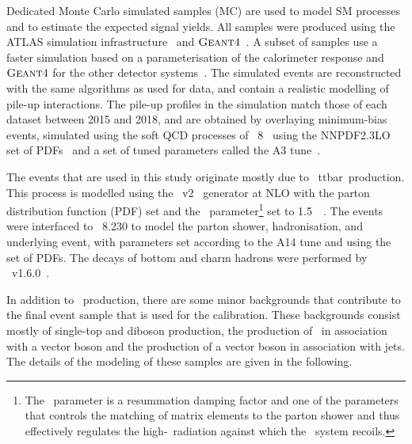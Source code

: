 \documentclass[letterpaper,12pt]{article}
\begin{document}
Dedicated Monte Carlo  simulated samples (MC)  are used to model SM
processes and to estimate the expected signal yields.  All samples were 
produced using the ATLAS simulation infrastructure~\cite{SOFT-2010-01}
and $\textsc{Geant}4$~\cite{Agostinelli:2002hh}. A subset of samples use a faster 
simulation based on a parameterisation of the calorimeter response and 
$\textsc{Geant}4$ for the other detector systems~\cite{SOFT-2010-01}. %
The simulated events are reconstructed with the same algorithms as
used for data, and contain a realistic modelling of pile-up
interactions. The pile-up profiles in the simulation match those of each dataset
between 2015 and 2018, and are obtained by overlaying minimum-bias events,
simulated using the soft QCD processes of
{\PYTHIA}~8~\cite{Sjostrand:2014zea} using the NNPDF2.3LO set of
PDFs~\cite{Ball:2012cx} and a set of tuned
parameters called the A3 tune~\cite{ATL-PHYS-PUB-2016-017}.

The events that are used in this study originate mostly due to \
ttbar\ production. This process is modelled using the
\powhegbox~v2~\cite{Frixione:2007nw,Nason:2004rx,Frixione:2007vw,Alioli:2010xd}
generator at NLO with the \nnpdfnlo %
parton distribution function (PDF) set
and the \hdamp\ parameter\footnote{The
  \hdamp\ parameter is a resummation damping factor and one of the
  parameters that controls the matching of \powheg matrix elements to
  the parton shower and thus effectively regulates the
  high-\pt\ radiation against which the \ttbar\ system recoils.} set
to 1.5~\mtop~\cite{ATL-PHYS-PUB-2016-020}.  The events were interfaced
to {\PYTHIA}~8.230 to model the parton shower,
hadronisation, and underlying event, with parameters set according
to the A14 tune and using the \nnpdftwo set of PDFs.
The decays of bottom and charm hadrons were performed by \evtgen~v1.6.0~\cite{EvtGen}.


In addition to \ttbar\ production, there are some minor backgrounds
that contribute to the final event sample that is used for the calibration.
These backgrounds consist mostly of single-top and diboson production, 
the production of \ttbar\ in association with a vector boson
and the production of a vector boson in association with jets.
The details
of the modeling of these samples are given in the following.
\end{document}
